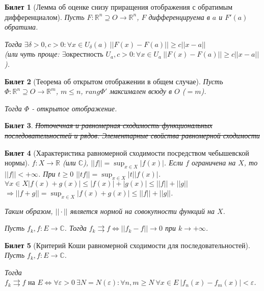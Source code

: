 \documentclass[11pt,a4paper,oneside]{scrartcl}
\newtheorem{ticket}{Билет}
\begin{document}
\addtocounter{ticket}{-1}
\begin{ticket}[Лемма об оценке снизу приращения отображения с обратимым дифференциалом]
    Пусть $F: \mathbb{R}^n \supseteq O \rightarrow \mathbb{R}^n$, $F$ дифференцируема в $a$
    и $F'(a)$ обратима.

    Тогда $\exists \delta > 0, c > 0 : \forall x \in U_\delta (a) \
    ||F(x) - F(a)|| \geq c||x-a||$ \\
    (или чуть проще: $\exists \text{окрестность } U_a, c > 0 : \forall x \in U_a \
    ||F(x) - F(a)|| \geq c||x-a||$).
\end{ticket}

\begin{ticket}[Теорема об открытом отображении в общем случае]
    Пусть $\Phi: \mathbb{R}^n \supseteq O \rightarrow \mathbb{R}^m$, $m \leq n$,
    $rang \Phi'$ максимален всюду в $O$ ($= m$).

    Тогда $\Phi$ - открытое отображение.
\end{ticket}

\setcounter{ticket}{25}
\addtocounter{ticket}{-1}
\begin{ticket}{\sout{Поточечная и равномерная сходимость функциональных последовательностей
    и рядов. Элементарные свойства равномерной сходимости}}
\end{ticket}

\addtocounter{ticket}{-1}
\begin{ticket}[Характеристика равномерной сходимости посредством чебышевской нормы]
    $f: X \rightarrow \mathbb{R}$ (или $\mathbb{C}$), $||f|| = \sup_{x \in X} |f(x)|$.
    Если $f$ ограничена на $X$, то $||f|| < +\infty$.
    При $t \geq 0$ $||tf|| = \sup_{x \in X} |t| |f(x)|$.
    $\forall x \in X |f(x)+g(x)| \leq |f(x)| + |g(x)| \leq ||f|| + ||g||$
    $\Rightarrow ||f+g|| = \sup_{x \in X} |f(x) + g(x)| \leq ||f|| + ||g||$.

    Таким образом, $||\cdot||$ является нормой на совокупности функций на $X$.

    Пусть $f_k, f: E \rightarrow \mathbb{C}$.
    Тогда $f_k \rightrightarrows f \Leftrightarrow ||f_k - f|| \rightarrow 0$
    при $k \rightarrow +\infty$.
\end{ticket}

\addtocounter{ticket}{-1}
\begin{ticket}[Критерий Коши равномерной сходимости для последовательностей]
    Пусть $f_k, f: E \rightarrow \mathbb{C}$.

    Тогда $f_k \rightrightarrows f \text{ на } E \Leftrightarrow
    \forall \varepsilon > 0 \ \exists N = N(\varepsilon) : \forall n, m \geq N \
    \forall x \in E \ |f_n(x) - f_m(x)| < \varepsilon$.
\end{ticket}
\end{document}
